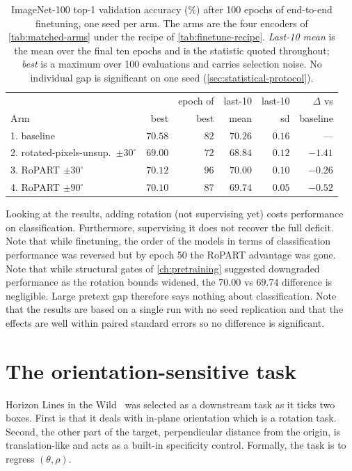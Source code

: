 \documentclass[final_report.tex]{subfiles}
\begin{document}
\begin{table}[htbp]
  \centering
  \caption[IN-100 classification, four arms]{ImageNet-100 top-1 validation accuracy
  (\%) after 100 epochs of end-to-end finetuning, one seed per arm. The arms are the
  four encoders of \cref{tab:matched-arms} under the recipe of
  \cref{tab:finetune-recipe}. \emph{Last-10 mean} is the
  mean over the final ten epochs and is the statistic quoted throughout; \emph{best} is
  a maximum over 100 evaluations and carries selection noise. No
  individual gap is significant on one seed (\cref{sec:statistical-protocol}).}
  \label{tab:in100-results}
  \footnotesize
  \begin{tabular}{@{}l r r r r r@{}}
    \toprule
    & & epoch of & last-10 & last-10 & $\Delta$ vs \\
    Arm & best & best & mean & sd & baseline \\
    \midrule
    1. baseline
      & $70.58$ & $82$ & $\mathbf{70.26}$ & $0.16$ & --- \\
    2. rotated-pixels-unsup.\ $\pm 30^\circ$
      & $69.00$ & $72$ & $68.84$ & $0.12$ & $\mathbf{-1.41}$ \\
    3. RoPART $\pm 30^\circ$
      & $70.12$ & $96$ & $70.00$ & $0.10$ & $-0.26$ \\
    4. RoPART $\pm 90^\circ$
      & $70.10$ & $87$ & $69.74$ & $0.05$ & $-0.52$ \\
    \bottomrule
  \end{tabular}
\end{table}

Looking at the results, adding rotation (not supervising yet) costs performance on classification. Furthermore, supervising it does not recover the full deficit. Note that while finetuning, the order of the models in terms of classification performance was reversed but by epoch 50 the RoPART advantage was gone. Note that while structural gates of \cref{ch:pretraining} suggested downgraded performance as the rotation bounds widened, the $70.00$ vs $69.74$ difference is negligible. Large pretext gap therefore says nothing about classification. Note that the results are based on a single run with no seed replication and that the effects are well within paired standard errors so no difference is significant.

\section{The orientation-sensitive task}\label{sec:hlw-task}
Horizon Lines in the Wild~\cite{hlw} was selected as a downstream task as it ticks two boxes. First is that it deals with in-plane orientation which is a rotation task. Second, the other part of the target, perpendicular distance from the origin, is translation-like and acts as a built-in specificity control. Formally, the task is to regress $(\theta,\rho)$.
\end{document}
